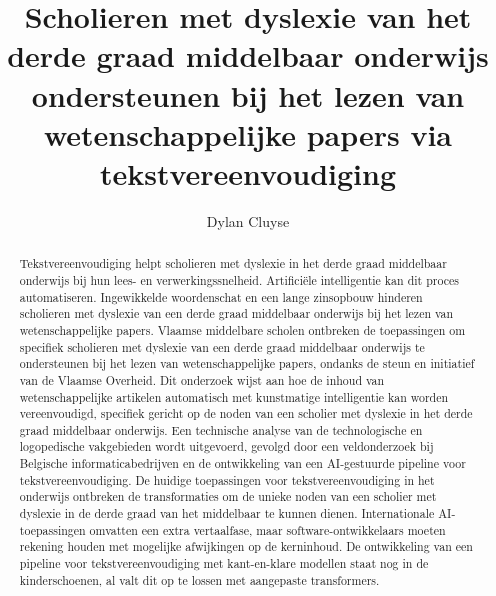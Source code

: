 \documentclass{hogent-article}
\title{Scholieren met dyslexie van het derde graad middelbaar onderwijs ondersteunen bij het lezen van wetenschappelijke papers via tekstvereenvoudiging}
\author{Dylan Cluyse}
\begin{document}
\begin{abstract}
Tekstvereenvoudiging helpt scholieren met dyslexie in het derde graad middelbaar onderwijs bij hun lees- en verwerkingssnelheid. Artificiële intelligentie kan dit proces automatiseren. Ingewikkelde woordenschat en een lange zinsopbouw hinderen scholieren met dyslexie van een derde graad middelbaar onderwijs bij het lezen van wetenschappelijke papers. Vlaamse middelbare scholen ontbreken de toepassingen om specifiek scholieren met dyslexie van een derde graad middelbaar onderwijs te ondersteunen bij het lezen van wetenschappelijke papers, ondanks de steun en initiatief van de Vlaamse Overheid. Dit onderzoek wijst aan hoe de inhoud van wetenschappelijke artikelen automatisch  met kunstmatige intelligentie kan worden vereenvoudigd, specifiek gericht op de noden van een scholier met dyslexie in het derde graad middelbaar onderwijs. Een technische analyse van de technologische en logopedische vakgebieden wordt uitgevoerd, gevolgd door een veldonderzoek bij Belgische informaticabedrijven en de ontwikkeling van een AI-gestuurde pipeline voor tekstvereenvoudiging. De huidige toepassingen voor tekstvereenvoudiging in het onderwijs ontbreken de transformaties om de unieke noden van een scholier met dyslexie in de derde graad van het middelbaar te kunnen dienen. Internationale AI-toepassingen omvatten een extra vertaalfase, maar software-ontwikkelaars moeten rekening houden met mogelijke afwijkingen op de kerninhoud. De ontwikkeling van een pipeline voor tekstvereenvoudiging met kant-en-klare modellen staat nog in de kinderschoenen, al valt dit op te lossen met aangepaste transformers.
\end{abstract}

\tableofcontents



\printbibliography[heading=bibintoc]
\end{document}
